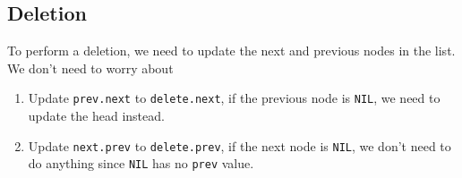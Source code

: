 \subsection{Deletion}\label{sub:deletionofelementsonadoublylinkedlist}

To perform a deletion, we need to update the next and previous nodes in the list.
We don't need to worry about

\begin{enumerate}
    \item Update \texttt{prev.next} to \texttt{delete.next}, if the previous node is \texttt{NIL}, we need to update the head instead.
    \item Update \texttt{next.prev} to \texttt{delete.prev}, if the next node is \texttt{NIL}, we don't need to do anything since \texttt{NIL} has no \texttt{prev} value.
\end{enumerate}

